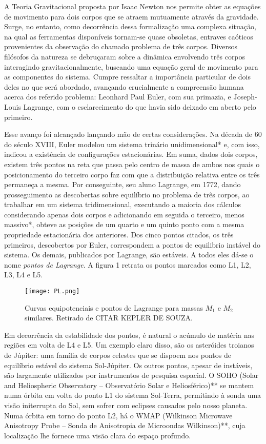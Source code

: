 A Teoria Gravitacional proposta por Isaac Newton nos permite obter as equações de movimento para  dois corpos que se atraem mutuamente através da gravidade. Surge, no entanto, como decorrência dessa formalização uma complexa situação, na qual as ferramentas disponíveis tornam-se quase obsoletas, entraves caóticos provenientes da observação do chamado problema de três corpos. Diversos filósofos da natureza se debruçaram sobre a dinâmica envolvendo três corpos interagindo gravitacionalmente, buscando uma equação geral de movimento para as componentes do sistema. Cumpre ressaltar a importância particular de dois deles no que será abordado, avançando crucialmente a compreensão humana acerca dos referido problema: Leonhard Paul Euler, com sua primazia, e Joseph-Louis Lagrange, com o esclarecimento do que havia sido deixado em aberto pelo primeiro.
   
Esse avanço foi alcançado lançando mão de certas considerações. Na década de 60 do século XVIII, Euler modelou um sistema trinário unidimensional* e, com isso, indicou a existência de configurações estacionárias. Em suma, dados dois corpos, existem três pontos na reta que passa pelo centro de massa de ambos nos quais o posicionamento do terceiro corpo faz com que a distribuição relativa entre os três permaneça a mesma. Por conseguinte, seu aluno Lagrange, em 1772, dando prosseguimento as descobertas sobre equilíbrio no problema de três corpos, ao trabalhar em um sistema tridimensional, executando a maioria dos cálculos considerando apenas dois corpos e adicionando em seguida o terceiro, menos massivo*, obteve as posições de um quarto e um quinto ponto com a mesma propriedade estacionária dos anteriores. Dos cinco pontos citados, os três primeiros, descobertos por Euler, correspondem a pontos de equilibrio instável do sistema. Os demais, publicados por Lagrange, são estáveis. A todos eles dá-se o nome \textit{pontos de Lagrange}. A figura 1 retrata os pontos marcados como L1, L2, L3, L4 e L5.

\begin{figure}[!h]
\centering
\texttt{[image: PL.png]}
\caption{Curvas equipotenciais e pontos de Lagrange para massas $M_1$ e $M_2$ similares. Retirado de CITAR KEPLER DE SOUZA.}
\end{figure}
   
Em decorrência da estabilidade dos pontos, é natural o acúmulo de matéria nas regiões em volta de L4 e L5. Um exemplo claro disso, são os asteróides troianos de Júpiter: uma família de corpos celestes que se dispoem nos pontos de equilíbrio estável do sistema Sol-Júpiter. Os outros pontos, apesar de instáveis, são largamente utilizados por instrumentos de pesquisa espacial. O SOHO (Solar and Heliospheric Observatory -- Observatório Solar e Heliosférico)** se mantem numa órbita em volta do ponto L1 do sistema Sol-Terra, permitindo à sonda uma visão initerrupta do Sol, sem sofrer com eclipses causados pelo nosso planeta. Numa órbita em torno do ponto L2, há o WMAP (Wilkinson Microwave Anisotropy Probe -- Sonda de Anisotropia de Microondas Wilkinson)**, cuja localização lhe fornece uma visão clara do espaço profundo.

